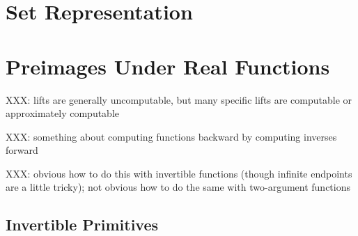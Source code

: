 \section{Set Representation}


\section{Preimages Under Real Functions}

\newcommand{\cl}[1]{\overline{\vphantom{i}{#1}}}
\newcommand{\sub}[1]{_{_{#1}}}

XXX: lifts are generally uncomputable, but many specific lifts are computable or approximately computable

XXX: something about computing functions backward by computing inverses forward

XXX: obvious how to do this with invertible functions (though infinite endpoints are a little tricky); not obvious how to do the same with two-argument functions

\subsection{Invertible Primitives}

